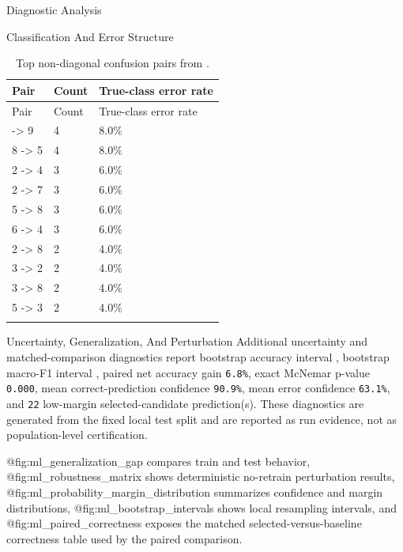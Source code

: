 \documentclass[
  ignorenonframetext,
]{beamer}
\begin{document}
\begin{frame}{Diagnostic Analysis}
\begin{block}{Classification And Error Structure}
\begin{longtable}[]{@{}lll@{}}
\caption{Top non-diagonal confusion pairs from
\protect{}.}\label{tbl:confusion-pairs}\tabularnewline
\toprule\noalign{}
Pair & Count & True-class error rate \\
\midrule\noalign{}
\endfirsthead
\toprule\noalign{}
Pair & Count & True-class error rate \\
\midrule\noalign{}
\endhead
4 -\textgreater{} 9 & 4 & 8.0\% \\
8 -\textgreater{} 5 & 4 & 8.0\% \\
2 -\textgreater{} 4 & 3 & 6.0\% \\
2 -\textgreater{} 7 & 3 & 6.0\% \\
5 -\textgreater{} 8 & 3 & 6.0\% \\
6 -\textgreater{} 4 & 3 & 6.0\% \\
2 -\textgreater{} 8 & 2 & 4.0\% \\
3 -\textgreater{} 2 & 2 & 4.0\% \\
3 -\textgreater{} 8 & 2 & 4.0\% \\
5 -\textgreater{} 3 & 2 & 4.0\% \\
\bottomrule\noalign{}
\end{longtable}
\end{block}

\begin{block}{Uncertainty, Generalization, And Perturbation}
\protect{}\label{sec:uncertainty-generalization-perturbation}
Additional uncertainty and matched-comparison diagnostics report
bootstrap accuracy interval , bootstrap
macro-F1 interval , paired net accuracy gain
\texttt{6.8\%}, exact McNemar p-value \texttt{0.000}, mean
correct-prediction confidence \texttt{90.9\%}, mean error confidence
\texttt{63.1\%}, and \texttt{22} low-margin selected-candidate
prediction(s). These diagnostics are generated from the fixed local test
split and are reported as run evidence, not as population-level
certification.

@fig:ml\_generalization\_gap compares train and test behavior,
@fig:ml\_robustness\_matrix shows deterministic no-retrain perturbation
results, @fig:ml\_probability\_margin\_distribution summarizes
confidence and margin distributions, @fig:ml\_bootstrap\_intervals shows
local resampling intervals, and @fig:ml\_paired\_correctness exposes the
matched selected-versus-baseline correctness table used by the paired
comparison.


\end{block}
\end{frame}
\end{document}
